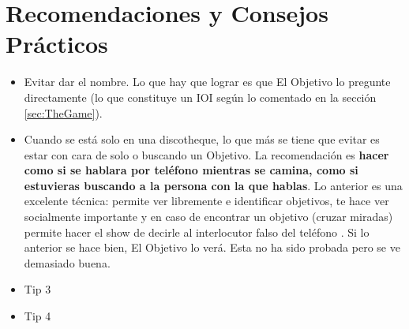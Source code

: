 \documentclass{article}
\begin{document}
\section{Recomendaciones y Consejos Prácticos\label{sec:tipsFinales}}
\begin{itemize}
\item Evitar dar el nombre. Lo que hay que lograr es que El Objetivo lo pregunte directamente (lo que constituye un IOI según lo comentado en la sección \ref{sec:TheGame}).
\item Cuando se está solo en una discotheque, lo que más se tiene que evitar es estar con cara de solo o buscando un Objetivo. La recomendación es \textbf{hacer como si se hablara por teléfono mientras se camina, como si estuvieras buscando a la persona con la que hablas}. Lo anterior es una excelente técnica: permite ver libremente e identificar objetivos, te hace ver socialmente importante y en caso de encontrar un objetivo (cruzar miradas) permite hacer el show de decirle al interlocutor falso del teléfono . Si lo anterior se hace bien, El Objetivo lo verá. {\color{red} Esta no ha sido probada pero se ve demasiado buena.}
\item Tip 3
\item Tip 4
\end{itemize}
\end{document}
